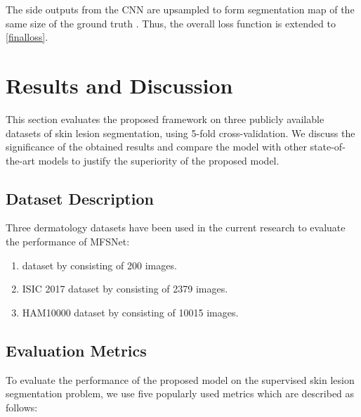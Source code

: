 \documentclass[review]{elsarticle}
\begin{document}
The side outputs from the CNN are upsampled to form segmentation map  of the same size of the ground truth . Thus, the overall loss function is extended to \autoref{finalloss}.


\section{Results and Discussion}\label{results}
This section evaluates the proposed framework on three publicly available datasets of skin lesion segmentation, using 5-fold cross-validation. We discuss the significance of the obtained results and compare the model with other state-of-the-art models to justify the superiority of the proposed model.

\subsection{Dataset Description}
Three dermatology datasets have been used in the current research to evaluate the performance of MFSNet: 
\begin{enumerate}
    \item  dataset by \cite{mendoncca2013ph} consisting of 200 images.
    \item ISIC 2017 dataset by \cite{codella2018skin} consisting of 2379 images.
    \item HAM10000 dataset by \cite{tschandl2018ham10000} consisting of 10015 images.
\end{enumerate}

\subsection{Evaluation Metrics}\label{experiment}
To evaluate the performance of the proposed model on the supervised skin lesion segmentation problem, we use five popularly used metrics which are described as follows:
\end{document}
